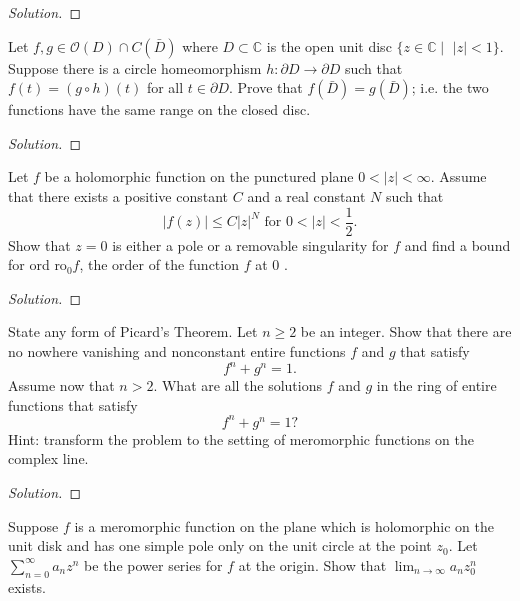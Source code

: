 \documentclass[10pt]{article}
\newenvironment{soln}{\begin{proof}[Solution]}{\end{proof}}
\begin{document}
\begin{soln}

\end{soln}



\begin{problem}
[2004 A-II-3]
Let $f, g \in \mathcal{O}(D) \cap C(\bar{D})$ where $D \subset \mathbb{C}$ is the open unit disc $\{z \in \mathbb{C} \mid$ $|z|<1\}$. Suppose there is a circle homeomorphism $h: \partial D \longrightarrow \partial D$ such that $f(t)=(g \circ h)(t)$ for all $t \in \partial D$. Prove that $f(\bar{D})=g(\bar{D})$; i.e. the two functions have the same range on the closed disc.
\end{problem}

\begin{soln}

\end{soln}



\begin{problem}
[2003 J-I-1]
Let $f$ be a holomorphic function on the punctured plane $0<|z|<\infty$. Assume that there exists a positive constant $C$ and a real constant $N$ such that
$$
|f(z)| \leq C|z|^N \text { for } 0<|z|<\frac{1}{2} .
$$
Show that $z=0$ is either a pole or a removable singularity for $f$ and find a bound for ord $\text{ro}_0 f$, the order of the function $f$ at 0 .
\end{problem}

\begin{soln}

\end{soln}



\begin{problem}
[2003 J-I-2]
State any form of Picard's Theorem. Let $n \geq 2$ be an integer. Show that there are no nowhere vanishing and nonconstant entire functions $f$ and $g$ that satisfy
$$
f^n+g^n=1 .
$$ Assume now that $n>2$. What are all the solutions $f$ and $g$ in the ring of entire functions that satisfy
$$
f^n+g^n=1 ?
$$
Hint: transform the problem to the setting of meromorphic functions on the complex line.
\end{problem}

\begin{soln}

\end{soln}



\begin{problem}
[2003 J-II-1]
Suppose $f$ is a meromorphic function on the plane which is holomorphic on the unit disk and has one simple pole only on the unit circle at the point $z_0$. Let $\sum_{n=0}^{\infty} a_n z^n$ be the power series for $f$ at the origin.
Show that $\lim _{n \rightarrow \infty} a_n z_0^n$ exists.
\end{problem}
\end{document}
